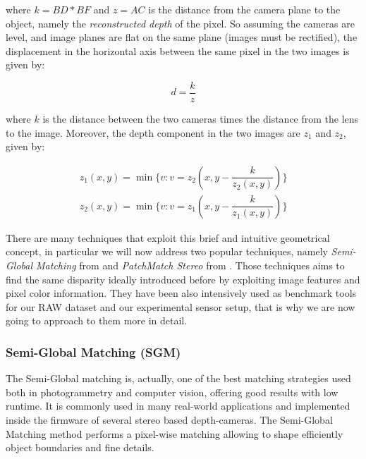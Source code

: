 where $k = BD * BF$ and $z = AC$ is the distance from the camera plane to the object, namely the \emph{reconstructed depth} of the pixel. So assuming the cameras are level, and image planes are flat on the same plane (images must be rectified), the displacement in the horizontal axis between the same pixel in the two images is given by:

\begin{equation}
    \label{eq:disparity1}
    d = \dfrac{k}{z}
\end{equation}

where $k$ is the distance between the two cameras times the distance from the lens to the image. Moreover, the depth component in the two images are $z_{1}$ and $z_{2}$, given by:

\begin{equation}
    \label{eq:depth}
    \begin{aligned}
    z_1(x, y) = \min\{v : v = z_2(x, y - \dfrac{k}{z_2(x,y)})\} \\
    z_2(x, y) = \min\{v : v = z_1(x, y - \dfrac{k}{z_1(x,y)})\}
    \end{aligned}
\end{equation}

There are many techniques that exploit this brief and intuitive geometrical concept, in particular we will now address two popular techniques, namely \emph{Semi-Global Matching} from  \cite{hirschmuller2005SemiGlobal} and \emph{PatchMatch Stereo} from \cite{bleyer2011PatchMatchStereo}. Those techniques aims to find the same disparity ideally introduced before by exploiting image features and pixel color information. They have been also intensively used as benchmark tools for our RAW dataset and our experimental sensor setup, that is why we are now going to approach to them more in detail.


\subsubsection{Semi-Global Matching (SGM)}\label{subsec:semiglobalmatching}
The Semi-Global matching is, actually, one of the best matching strategies used both in photogrammetry and computer vision, offering good results with low runtime. It is commonly used in many real-world applications and implemented inside the firmware of several stereo based depth-cameras. The Semi-Global Matching method \cite{hirschmuller2005SemiGlobal} performs a pixel-wise matching allowing to shape efficiently object boundaries and fine details. 

